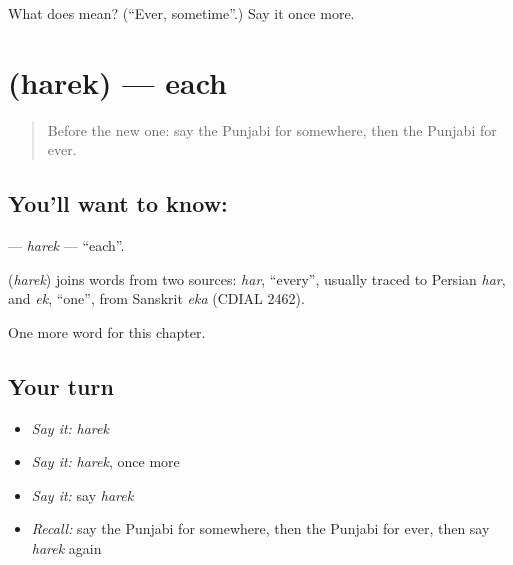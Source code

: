 \begin{tcolorbox}[breakable,colback=teal!4,colframe=teal!35!black,title={Before you move on}]
What does  mean? (\textquotedblleft{}Ever, sometime\textquotedblright{}.) Say it once more.
\end{tcolorbox}
\section[\texorpdfstring{\pa{ਹਰੇਕ} (harek)}{ਹਰੇਕ (harek)}]{ (harek) — each}

\label{lesson:PA-C106-harek}



\begin{quote}
Before the new one: say the Punjabi for somewhere, then the Punjabi for ever.
\end{quote}

\subsection*{You'll want to know: }
\textbf{} — \emph{harek} — \textquotedblleft{}each\textquotedblright{}.

\begin{cousinweb}
\textbf{} (\emph{harek}) joins words from two sources: \emph{har}, \textquotedblleft{}every\textquotedblright{}, usually traced to Persian \emph{har}, and \emph{ek}, \textquotedblleft{}one\textquotedblright{}, from Sanskrit \emph{eka} (CDIAL 2462).
\end{cousinweb}

\begin{grammarlens}[title={What you've built}]
One more word for this chapter.
\end{grammarlens}

\subsection*{Your turn}
\begin{itemize}
\raggedright
  \item \emph{Say it:} \emph{harek}
  \item \emph{Say it:} \emph{harek}, once more
  \item \emph{Say it:} say \emph{harek}
  \item \emph{Recall:} say the Punjabi for somewhere, then the Punjabi for ever, then say \emph{harek} again
\end{itemize}

